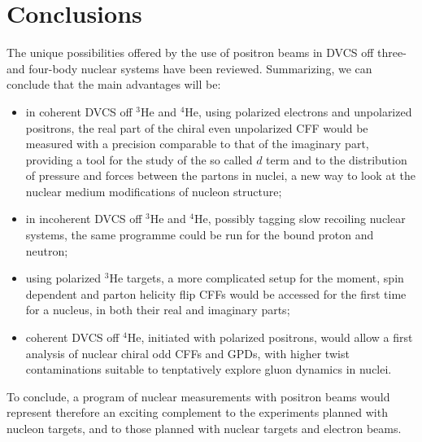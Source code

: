 \documentclass[times, twoside]{PosWhiPap}
\begin{document}
\section*{Conclusions}
{The unique possibilities offered by the use of positron beams in DVCS off 
three- and four-body nuclear systems have been reviewed. Summarizing, we can 
conclude that the main advantages will be:
\begin{itemize}
    \item in coherent DVCS off $^3$He and $^4$He, using polarized electrons and 
       unpolarized positrons, the real part of the chiral even unpolarized CFF 
       would be measured with a precision comparable to that of the imaginary 
       part, providing a tool for the study of the so called $d$ term and to 
       the distribution of pressure and forces between the partons in nuclei, a 
    new way to look at the nuclear medium modifications of nucleon structure;  
 \item in incoherent DVCS off $^3$He and $^4$He, possibly tagging slow 
    recoiling nuclear systems, the same programme could be run for the bound 
      proton and neutron;
    \item using polarized $^3$He targets, a more complicated setup for the 
       moment, spin dependent and parton helicity flip CFFs would be accessed 
       for the first time for a nucleus, in both their real and imaginary 
       parts;
    \item coherent DVCS off $^4$He, initiated with polarized positrons, would 
       allow a first analysis of nuclear chiral odd CFFs and GPDs, with higher 
       twist contaminations suitable to tenptatively explore gluon dynamics in 
       nuclei.
\end{itemize}
To conclude, a program of nuclear measurements with positron beams would 
represent therefore an exciting complement to the experiments planned with 
nucleon targets, and to those planned with nuclear targets and electron beams.
}






\end{document}
